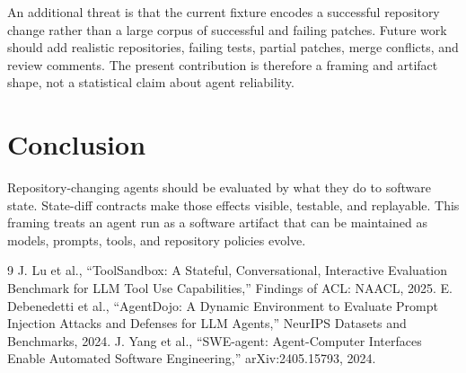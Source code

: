 \documentclass[10pt,conference]{IEEEtran}
\begin{document}
An additional threat is that the current fixture encodes a successful
repository change rather than a large corpus of successful and failing patches.
Future work should add realistic repositories, failing tests, partial patches,
merge conflicts, and review comments. The present contribution is therefore a
framing and artifact shape, not a statistical claim about agent reliability.

\section{Conclusion}

Repository-changing agents should be evaluated by what they do to software
state. State-diff contracts make those effects visible, testable, and
replayable. This framing treats an agent run as a software artifact that can be
maintained as models, prompts, tools, and repository policies evolve.

\begin{thebibliography}{9}
 J. Lu et al., ``ToolSandbox: A Stateful, Conversational,
Interactive Evaluation Benchmark for LLM Tool Use Capabilities,'' Findings of
ACL: NAACL, 2025.
 E. Debenedetti et al., ``AgentDojo: A Dynamic Environment
to Evaluate Prompt Injection Attacks and Defenses for LLM Agents,'' NeurIPS
Datasets and Benchmarks, 2024.
 J. Yang et al., ``SWE-agent: Agent-Computer Interfaces
Enable Automated Software Engineering,'' arXiv:2405.15793, 2024.
\end{thebibliography}
\end{document}
